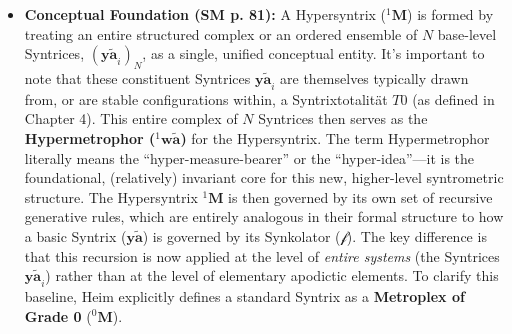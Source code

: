 \documentclass[12pt]{article}
\newcommand{\q}[1]{\enquote{#1}}
\newcommand{\syntrix}{\bm{y\widetilde{a}}}
\newcommand{\synkolator}{\mathcal{f}}
\newcommand{\syntrixtotalitaet}{T0}
\newcommand{\metroplex}[1]{{}^{#1}\mathbf{M}}
\newcommand{\hypersyntrix}{\metroplex{1}}
\newcommand{\hypermetrophor}[1]{{}^{#1}\mathbf{w\widetilde{a}}}
\begin{document}
\begin{itemize}
    \item \textbf{Conceptual Foundation (SM p. 81):}
    A Hypersyntrix (\(\hypersyntrix\)) is formed by treating an entire structured complex or an ordered ensemble of \( N \) base-level Syntrices, \( (\syntrix_i)_N \), as a single, unified conceptual entity. It's important to note that these constituent Syntrices \( \syntrix_i \) are themselves typically drawn from, or are stable configurations within, a Syntrixtotalität \( \syntrixtotalitaet \) (as defined in Chapter 4). This entire complex of \(N\) Syntrices then serves as the \textbf{Hypermetrophor (\( \hypermetrophor{1} \))} for the Hypersyntrix. The term Hypermetrophor literally means the \q{hyper-measure-bearer} or the \q{hyper-idea}—it is the foundational, (relatively) invariant core for this new, higher-level syntrometric structure. The Hypersyntrix \( \hypersyntrix \) is then governed by its own set of recursive generative rules, which are entirely analogous in their formal structure to how a basic Syntrix (\(\syntrix\)) is governed by its Synkolator (\(\synkolator\)). The key difference is that this recursion is now applied at the level of \textit{entire systems} (the Syntrices \( \syntrix_i \)) rather than at the level of elementary apodictic elements. To clarify this baseline, Heim explicitly defines a standard Syntrix as a \textbf{Metroplex of Grade 0} (\(\metroplex{0}\)).


\end{itemize}
\end{document}
